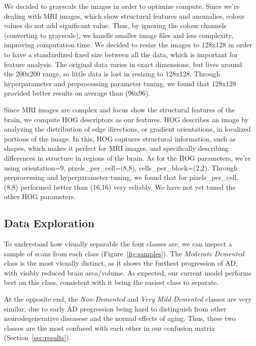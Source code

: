 \documentclass[11pt]{article}
\begin{document}
We decided to grayscale the images in order to optimize compute. Since we're dealing with MRI images, which show structural features and anomalies, colour values do not add significant value. Thus, by ignoring the colour channels (converting to grayscale), we handle smaller image files and less complexity, improving computation time. We decided to resize the images to 128x128 in order to have a standardized fixed size between all the data, which is important for feature analysis. The original data varies in exact dimensions, but lives around the 200x200 range, so little data is lost in resizing to 128x128. Through hyperparameter and preprocessing parameter tuning, we found that 128x128 provided better results on average than (96x96).

Since MRI images are complex and focus show the structural features of the brain, we compute HOG descriptors as our features. HOG describes an image by analyzing the distribution of edge directions, or gradient orientations, in localized portions of the image. In this, HOG captures structural information, such as shapes, which makes it perfect for MRI images, and specifically describing differences in structure in regions of the brain. As for the HOG parameters, we're using orientation=9, pixels\_per\_cell=(8,8), cells\_per\_block=(2,2). Through preprocessing and hyperparameter tuning, we found that for pixels\_per\_cell, (8,8) performed better than (16,16) very reliably. We have not yet tuned the other HOG parameters.

\subsection{Data Exploration}

To understand how visually separable the four classes are, we can inspect a sample of scans from each class (Figure~\ref{fig:samples}). The \textit{Moderate Demented} class is the most visually distinct, as it shows the furthest progression of AD, with visibly reduced brain area/volume. As expected, our current model performs best on this class, consistent with it being the easiest class to separate.

At the opposite end, the \textit{Non-Demented} and \textit{Very Mild Demented} classes are very similar, due to early AD progression being hard to distinguish from other neurodegenerative diseasese and the normal effects of aging. Thus, these two classes are the most confused with each other in our confusion matrix (Section~\ref{sec:results}).
\end{document}
